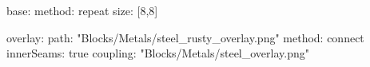 base:
  method: repeat
  size: [8,8]

overlay:
  path: "Blocks/Metals/steel_rusty_overlay.png"
  method: connect
  innerSeams: true
  coupling: "Blocks/Metals/steel_overlay.png"